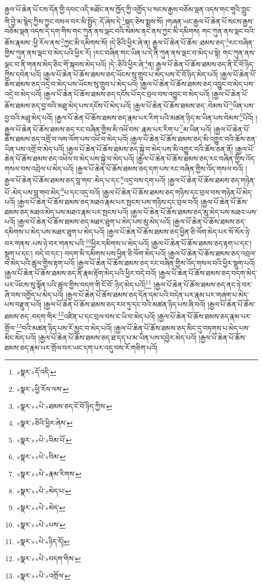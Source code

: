 རྒྱལ་པོ་ཆེན་པོ་ངས་དོན་གྱི་དབང་འདི་མཐོང་ནས་ཁྱོད་ཀྱི་འགྱོད་པ་སངས་རྒྱས་བཅོམ་ལྡན་འདས་གང་གཱའི་ཀླུང་གི་བྱེ་མ་སྙེད་ཀྱིས་ཀྱང་བསལ་བར་མི་སྤྱོད་:དོ་ཞེས་དེ་\footnote{«སྣར་»དོ་འདི་}སྐད་ཅེས་སྨྲས་སོ། །གཞན་ཡང་རྒྱལ་པོ་ཆེན་པོ་སངས་རྒྱས་བཅོམ་ལྡན་འདས་དེ་དག་གིས་གང་ཀུན་ནས་ལྡང་བའི་སེམས་ནང་ནས་ཀྱང་མི་དམིགས། གང་ཀུན་ནས་ལྡང་བའི་ཆོས་རྣམས་:ཕྱི་རོལ་ནས་\footnote{«སྣར་»ཕྱི་རོལ་ལས་}ཀྱང་མི་དམིགས་སོ། །དེ་ཅིའི་ཕྱིར་ཞེ་ན། རྒྱལ་པོ་ཆེན་པོ་ཆོས་:ཐམས་ཅད་\footnote{«སྣར་»«པེ་»ཐམས་ཅད་ངོ་བོ་ཉིད་ཀྱིས་}རང་བཞིན་གྱིས་ཀུན་ནས་ལྡང་བ་མེད་པའི་ཕྱིར་རོ། །རང་བཞིན་གང་ཡིན་པ་དེ་ནི་ཀུན་ནས་ལྡང་བ་མེད་པ་སྟེ། གང་ཀུན་ནས་ལྡང་བ་ནི་གནས་མེད་ཅིང་གོ་སྐབས་མེད་པའོ། །དེ་:ཅིའི་ཕྱིར་ཞེ་\footnote{«སྣར་»ཅིའི་ཕྱིར་ཞེས་}ན། རྒྱལ་པོ་ཆེན་པོ་ཆོས་ཐམས་ཅད་ནི་ངོ་བོ་ཉིད་ཀྱིས་དབེན་པའོ། །རྒྱལ་པོ་ཆེན་པོ་ཆོས་ཐམས་ཅད་ཡོངས་སུ་གྲུབ་པ་མེད་པས་ངོ་བོ་ཉིད་མེད་པའོ། །རྒྱལ་པོ་ཆེན་པོ་ཆོས་ཐམས་ཅད་འདྲེ་བ་མེད་པས་ཡོངས་སུ་གྲུབ་པ་མེད་པའོ། །རྒྱལ་པོ་ཆེན་པོ་ཆོས་ཐམས་ཅད་འབྱུང་བ་མེད་པས་འདྲེ་བ་མེད་པའོ། །རྒྱལ་པོ་ཆེན་པོ་ཆོས་ཐམས་ཅད་དངོས་པོ་དང་བྲལ་བས་འབྱུང་བ་མེད་པའོ། །རྒྱལ་པོ་ཆེན་པོ་ཆོས་ཐམས་ཅད་བྱ་བའི་མཐུ་མེད་པས་དངོས་པོ་མེད་པའོ། །རྒྱལ་པོ་ཆེན་པོ་ཆོས་ཐམས་ཅད་:བེམས་པོ་\footnote{«སྣར་»«པེ་»བིམ་པོ་}ཡིན་པས་བྱ་བའི་མཐུ་མེད་པའོ། །རྒྱལ་པོ་ཆེན་པོ་ཆོས་ཐམས་ཅད་རྣམ་པར་རིག་པའི་མཚན་ཉིད་མ་ཡིན་པས་བེམས་\footnote{«སྣར་»«པེ་»བིམ་}པོའོ། །རྒྱལ་པོ་ཆེན་པོ་ཆོས་ཐམས་ཅད་རང་བཞིན་གྱིས་མི་འཕོ་བས་:རྣམ་པར་རིག་པ་\footnote{«སྣར་»«པེ་»རྣམ་རིགས་}མ་ཡིན་པའོ། །རྒྱལ་པོ་ཆེན་པོ་ཆོས་ཐམས་ཅད་འགྲོ་བ་ལས་ལོག་པས་འཕོ་བ་མེད་པའོ། །རྒྱལ་པོ་ཆེན་པོ་ཆོས་ཐམས་ཅད་མི་འགྱུར་བའི་ཆོས་ཅན་ཡིན་པས་འགྲོ་བ་མེད་པའོ། །རྒྱལ་པོ་ཆེན་པོ་ཆོས་ཐམས་ཅད་སྐྱེ་བ་མེད་པས་མི་འགྱུར་བའི་ཆོས་ཅན་ནོ། །རྒྱལ་པོ་ཆེན་པོ་ཆོས་ཐམས་ཅད་འཕེལ་བ་མེད་པས་སྐྱེ་བ་མེད་པའོ། །རྒྱལ་པོ་ཆེན་པོ་ཆོས་ཐམས་ཅད་རང་བཞིན་གྱིས་འོད་གསལ་བས་འབྲེལ་པ་མེད་པའོ། །རྒྱལ་པོ་ཆེན་པོ་ཆོས་ཐམས་ཅད་དག་པས་རང་བཞིན་གྱིས་འོད་གསལ་བའོ། །རྒྱལ་པོ་ཆེན་པོ་ཆོས་ཐམས་ཅད་བླ་གབ་:མེད་པ་དང་\footnote{«སྣར་»«པེ་»མེད་པ་}འདྲ་བས་དག་པའོ། །རྒྱལ་པོ་ཆེན་པོ་ཆོས་ཐམས་ཅད་གཉེན་པོ་:མེད་པས་བླ་གབ་མེད་\footnote{«སྣར་»«པེ་»མེད་}པ་དང་འདྲ་བའོ། །རྒྱལ་པོ་ཆེན་པོ་ཆོས་ཐམས་ཅད་གཉིས་དང་བྲལ་བས་གཉེན་པོ་མེད་པའོ། །རྒྱལ་པོ་ཆེན་པོ་ཆོས་ཐམས་ཅད་མཐའ་རྣམ་པར་སྤངས་པས་གཉིས་དང་བྲལ་བའོ། །རྒྱལ་པོ་ཆེན་པོ་ཆོས་ཐམས་ཅད་མཐའ་མེད་པས་མཐའ་རྣམ་པར་སྤངས་པའོ། །རྒྱལ་པོ་ཆེན་པོ་ཆོས་ཐམས་ཅད་མུ་མེད་པས་མཐའ་ཡས་པའོ། །རྒྱལ་པོ་ཆེན་པོ་ཆོས་ཐམས་ཅད་མཐར་ཐུག་པ་མེད་པས་མུ་མེད་པའོ། །རྒྱལ་པོ་ཆེན་པོ་ཆོས་ཐམས་ཅད་དམིགས་པ་མེད་པས་མཐར་ཐུག་པ་མེད་པའོ། །རྒྱལ་པོ་ཆེན་པོ་ཆོས་ཐམས་ཅད་ཕྱིན་ཅི་ལོག་མེད་པར་སོ་སོར་ཉེ་བར་གནས་:པས་ཉེ་བར་གནས་པའི་\footnote{«སྣར་»«པེ་»པས་}ཕྱིར་དམིགས་པ་མེད་པའོ། །རྒྱལ་པོ་ཆེན་པོ་ཆོས་ཐམས་ཅད་རྟག་པ་དང་། སྡུག་པ་དང་། བདེ་བ་དང་། བདག་མི་དམིགས་པས་ཕྱིན་ཅི་ལོག་མེད་པའོ། །རྒྱལ་པོ་ཆེན་པོ་ཆོས་ཐམས་ཅད་འབྲལ་བ་མེད་པའི་ཚུལ་གྱིས་རྟག་པའོ། །རྒྱལ་པོ་ཆེན་པོ་ཆོས་ཐམས་ཅད་རང་བཞིན་གྱིས་འོད་གསལ་བའི་ཕྱིར་སྡུག་པའོ། །རྒྱལ་པོ་ཆེན་པོ་ཆོས་ཐམས་ཅད་ནི་རྣམ་རྟོག་མེད་པའི་ཕྱིར་བདེ་བའོ། །རྒྱལ་པོ་ཆེན་པོ་ཆོས་ཐམས་ཅད་བདག་མེད་པར་ཡོངས་སུ་སྟོན་པའི་ཚུལ་གྱིས་བདག་གི་ངོ་བོ་:ཉིད་མེད་པའོ།\footnote{«སྣར་»«པེ་»ཉིད་དོ།} །རྒྱལ་པོ་ཆེན་པོ་ཆོས་ཐམས་ཅད་ནང་ཉེ་བར་ཞི་བས་འགྱོད་པ་མེད་པའོ། །རྒྱལ་པོ་ཆེན་པོ་ཆོས་ཐམས་ཅད་དོན་དམ་པའི་བདེན་པར་རྣམ་པར་གཞག་པ་མེད་པས་བརྫུན་པའོ། །རྒྱལ་པོ་ཆེན་པོ་ཆོས་ཐམས་ཅད་རབ་ཏུ་དང་བའི་མཚན་ཉིད་པས་ཞི་བའོ། །རྒྱལ་པོ་ཆེན་པོ་ཆོས་ཐམས་ཅད་:བདག་གིར་\footnote{«སྣར་»«པེ་»བདག་གིས་}འཛིན་པ་དང་བྲལ་བས་ང་ཡི་བ་མེད་པའོ། །རྒྱལ་པོ་ཆེན་པོ་ཆོས་ཐམས་ཅད་རྣམ་པར་གྲོལ་\footnote{«སྣར་»«པེ་»འགྲོལ་}བའི་མཚན་ཉིད་པས་རོ་མྱང་བ་མེད་པའོ། །རྒྱལ་པོ་ཆེན་པོ་ཆོས་ཐམས་ཅད་མིང་དུ་བཏགས་པ་མེད་པས་མིང་མེད་པའོ། །རྒྱལ་པོ་ཆེན་པོ་ཆོས་ཐམས་ཅད་ཐ་དད་པ་མ་ཡིན་པས་དབྱེར་མེད་པའོ། །རྒྱལ་པོ་ཆེན་པོ་ཆོས་ཐམས་ཅད་རྣམ་པར་གྲོལ་བར་ཡང་དག་པར་འདུ་བས་རོ་གཅིག་པའོ། 